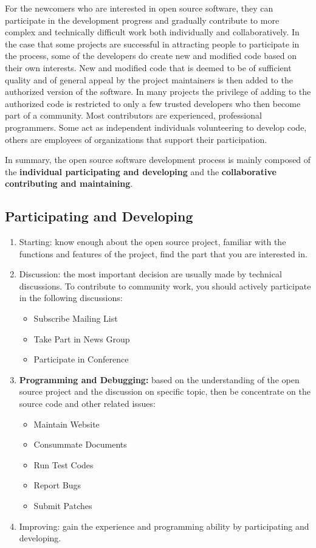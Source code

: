 \documentclass[draftclsnofoot,journal,onecolumn,12pt]{IEEEtran}
\begin{document}
For the newcomers who are interested in open source software, they can participate in the development progress and gradually contribute to more complex and technically difficult work both individually and collaboratively. In the case that some projects are successful in attracting people to participate in the process, some of the developers do create new and modified code based on their own interests. New and modified code that is deemed to be of sufficient quality and of general appeal by the project maintainers is then added to the authorized version of the software. In many projects the privilege of adding to the authorized code is restricted to only a few trusted developers who then become part of a community. Most contributors are experienced, professional programmers. Some act as independent individuals volunteering to develop code, others are employees of organizations that support their participation.

In summary, the open source software development process is mainly composed of the \textbf{individual participating and developing} and the \textbf{collaborative contributing and maintaining}.

\subsection{Participating and Developing}
\begin{enumerate}
  \item Starting: know enough about the open source project, familiar with the functions and features of the project, find the part that you are interested in.
  \item Discussion: the most important decision are usually made by technical discussions. To contribute to community work, you should actively participate in the following discussions:
  \begin{itemize}
    \item Subscribe Mailing List
    \item Take Part in News Group
    \item Participate in Conference
  \end{itemize}
  \item \textbf{Programming and Debugging:} based on the understanding of the open source project and the discussion on specific topic, then be concentrate on the source code and other related issues:
  \begin{itemize}
    \item Maintain Website
    \item Consummate Documents
    \item Run Test Codes
    \item Report Bugs
    \item Submit Patches
  \end{itemize}
  \item Improving: gain the experience and programming ability by participating and developing.
\end{enumerate}
\end{document}
